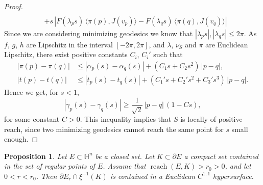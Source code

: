 \documentclass[10pt]{amsart}
\newtheorem{proposition}[theorem]{Proposition}
\theoremstyle{definition}
\theoremstyle{remark}
\numberwithin{equation}{section}
\begin{document}
\begin{proof}
\begin{align*}
\\
&+s\,|F({\lambda}_{p}s)\,{\langle{\pi(p),J(v_{p})}\rangle}-F({\lambda}_{q}s)\,{\langle{\pi(q),J(v_{q})}\rangle}|
\end{align*}
Since we are considering minimizing geodesics we know that $|{\lambda}_{p} s|, |{\lambda}_{q}s|{\leqslant} 2\pi$. As $f$, $g$, $h$ are Lipschitz in the interval $[-2\pi,2\pi]$, and ${\lambda}$, $\nu_{S}$ and $\pi$ are Euclidean Lipschitz, there exist positive constants $C_{i}$, $C_{i}'$ such that
\begin{align*}
|\pi(p)-\pi(q)|&{\leqslant}
|\alpha_{p}(s)-\alpha_{q}(s)|+(C_{1}s+C_{2}s^2)\,|p-q|,
\\
|t(p)-t(q)|&{\leqslant}
|t_{p}(s)-t_{q}(s)|+(C_{1}'s+C_{2}'s^2+C_{3}'s^3)\,|p-q|.
\end{align*}
Hence we get, for $s<1$,
\begin{equation*}
|{\gamma}_{p}(s)-{\gamma}_{q}(s)|{\geqslant} \frac{1}{\sqrt{2}}\,|p-q|\,(1-Cs),
\end{equation*}
for some constant $C>0$. This inequality implies that $S$ is locally of positive reach, since two minimizing geodesics cannot reach the same point for $s$ small enough.
\end{proof}

\begin{proposition}
\label{prop:parallelc11}
Let $E\subset{{\mathbb{H}}}^n$ be a closed set. Let $K\subset{\partial} E$ a compact set contained in the set of regular points of $E$. Assume that $\operatorname{reach}(E,K)>r_{0}>0$, and let $0<r<r_{0}$. Then ${\partial} E_{r}\cap\xi^{-1}(K)$ is contained in a Euclidean $C^{1,1}$ hypersurface.
\end{proposition}
\end{document}
